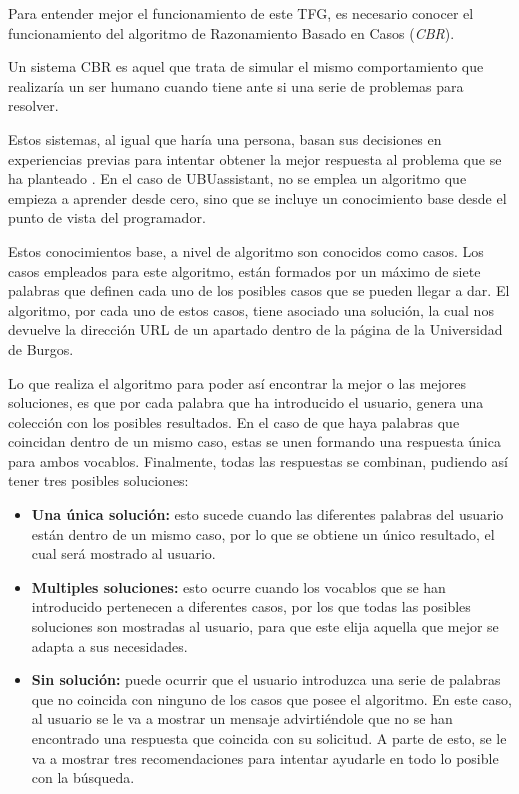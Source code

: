 
Para entender mejor el funcionamiento de este TFG, es necesario conocer el funcionamiento del algoritmo de Razonamiento Basado en Casos (\textit{CBR}).

Un sistema CBR es aquel que trata de simular el mismo comportamiento que realizaría un ser humano cuando tiene ante si una serie de problemas para resolver.

Estos sistemas, al igual que haría una persona, basan sus decisiones en experiencias previas para intentar obtener la mejor respuesta al problema que se ha planteado \cite{cbr:wiki}. En el caso de UBUassistant, no se emplea un algoritmo que empieza a aprender desde cero, sino que se incluye un conocimiento base desde el punto de vista del programador.

Estos conocimientos base, a nivel de algoritmo son conocidos como casos. Los casos empleados para este algoritmo, están formados por un máximo de siete palabras que definen cada uno de los posibles casos que se pueden llegar a dar. El algoritmo, por cada uno de estos casos, tiene asociado una solución, la cual nos devuelve la dirección URL de un apartado dentro de la página de la Universidad de Burgos.

Lo que realiza el algoritmo para poder así encontrar la mejor o las mejores soluciones, es que por cada palabra que ha introducido el usuario, genera una colección con los posibles resultados. En el caso de que haya palabras que coincidan dentro de un mismo caso, estas se unen formando una respuesta única para ambos vocablos. Finalmente, todas las respuestas se combinan, pudiendo así tener tres posibles soluciones:

\begin{itemize}
	\tightlist
	\item
	\textbf{Una única solución:} esto sucede cuando las diferentes palabras del usuario están dentro de un mismo caso, por lo que se obtiene un único resultado, el cual será mostrado al usuario.
	\item 
	\textbf{Multiples soluciones:} esto ocurre cuando los vocablos que se han introducido pertenecen a diferentes casos, por los que todas las posibles soluciones son mostradas al usuario, para que este elija aquella que mejor se adapta a sus necesidades.
	\item 
	\textbf{Sin solución:} puede ocurrir que el usuario introduzca una serie de palabras que no coincida con ninguno de los casos que posee el algoritmo. En este caso, al usuario se le va a mostrar un mensaje advirtiéndole que no se han encontrado una respuesta que coincida con su solicitud. A parte de esto, se le va a mostrar tres recomendaciones para intentar ayudarle en todo lo posible con la búsqueda.
\end{itemize}

